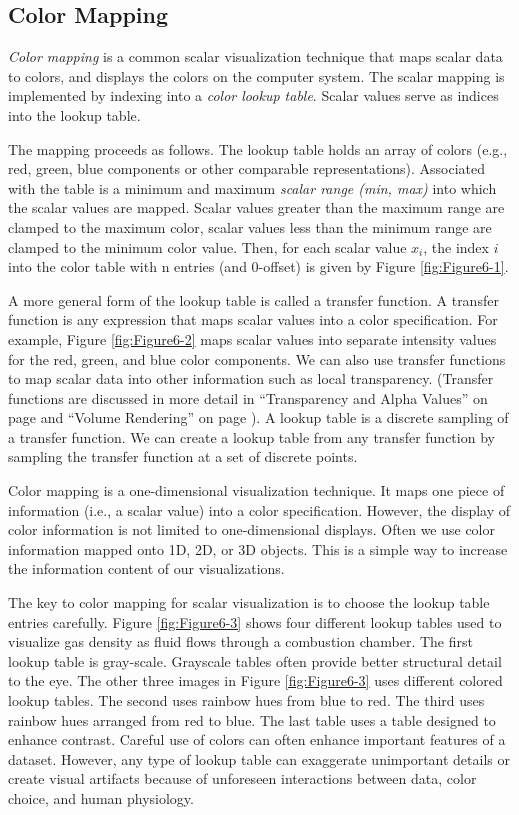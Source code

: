 \subsection{Color Mapping}

\emph{Color mapping} is a common scalar visualization technique that maps scalar data to colors, and displays the colors on the computer system. The scalar mapping is implemented by indexing into a \emph{color lookup table}. Scalar values serve as indices into the lookup table.

The mapping proceeds as follows. The lookup table holds an array of colors (e.g., red, green, blue components or other comparable representations). Associated with the table is a minimum and maximum \emph{scalar range (min, max)} into which the scalar values are mapped. Scalar values greater than the maximum range are clamped to the maximum color, scalar values less than the minimum range are clamped to the minimum color value. Then, for each scalar value $x_i$, the index $i$ into the color table with n entries (and 0-offset) is given by Figure \ref{fig:Figure6-1}.

A more general form of the lookup table is called a transfer function. A transfer function is any expression that maps scalar values into a color specification. For example, Figure \ref{fig:Figure6-2} maps scalar values into separate intensity values for the red, green, and blue color components. We can also use transfer functions to map scalar data into other information such as local transparency. (Transfer functions are discussed in more detail in ``Transparency and Alpha Values'' on page \pageref{sec:transparency_alpha} and ``Volume Rendering'' on page \pageref{sec:volume_rendering}).
A lookup table is a discrete sampling of a transfer function.
We can create a lookup table from any transfer function by sampling the transfer function at a set of discrete points.

Color mapping is a one-dimensional visualization technique. It maps one piece of information (i.e., a scalar value) into a color specification. However, the display of color information is not limited to one-dimensional displays. Often we use color information mapped onto 1D, 2D, or 3D objects. This is a simple way to increase the information content of our visualizations.

The key to color mapping for scalar visualization is to choose the lookup table entries carefully. Figure \ref{fig:Figure6-3} shows four different lookup tables used to visualize gas density as fluid flows through a combustion chamber. The first lookup table is gray-scale. Grayscale tables often provide better structural detail to the eye. The other three images in Figure \ref{fig:Figure6-3} uses different colored lookup tables. The second uses rainbow hues from blue to red. The third uses rainbow hues arranged from red to blue. The last table uses a table designed to enhance contrast. Careful use of colors can often enhance important features of a dataset. However, any type of lookup table can exaggerate unimportant details or create visual artifacts because of unforeseen interactions between data, color choice, and human physiology.

